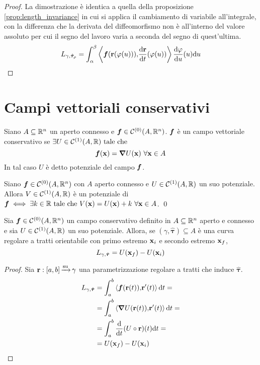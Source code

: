 \begin{proof}
	La dimostrazione è identica a quella della proposizione \ref{prop:length_invariance} in cui si applica il cambiamento di variabile all'integrale, con la differenza che la derivata del diffeomorfismo non è all'interno del valore assoluto per cui il segno del lavoro varia a seconda del segno di quest'ultima.
	$$
		L_{\gamma,\hat{\bm\tau}_\rho}=\int_{\alpha}^{\beta}\left\langle\bm f(\vb{r}(\varphi(u))){,}\frac{\dd \vb{r}}{\dd t}(\varphi(u))\right\rangle\frac{\dd \varphi}{\dd u}(u)\dd u
	$$
\end{proof}

\section{Campi vettoriali conservativi}

\begin{definition}
	Siano $A \subseteq \mathbb{R}^n$ un aperto connesso e $\bm f \in \mathcal{C}^{(0)}(A,\mathbb{R}^n)$. $\bm f$ è un campo vettoriale conservativo se $\exists U \in \mathcal{C}^{(1)}(A,\mathbb{R}) \text{ tale che }$
	$$
		\vecf(\vb{x})=\grad U(\vb{x}) \ \forall \vb{x} \in A
	$$
	In tal caso $U$ è detto potenziale del campo $\bm f$.
\end{definition}

\begin{prop}
	Siano $\bm f \in \mathcal{C}^{(0)}(A,\mathbb{R}^n)$ con $A$ aperto connesso e $U \in \mathcal{C}^{(1)}(A,\mathbb{R})$ un suo potenziale. Allora $V\in \mathcal{C}^{(1)}(A,\mathbb{R})$ è un potenziale di $\bm f \iff \exists k \in \mathbb{R} \text{ tale che } V(\vb{x})=U(\vb{x}) + k \ \forall \vb{x} \in A$.
	\qed
\end{prop}

\begin{theorem}
	\label{thm:cvc_work}
	Sia $\bm f \in \mathcal{C}^{(0)}(A,\mathbb{R}^n)$ un campo conservativo definito in $A\subseteq\mathbb{R}^n$ aperto e connesso e sia $U \in \mathcal{C}^{(1)}(A,\mathbb{R})$ un suo potenziale. Allora, se $(\gamma,\hat{\bm\tau}) \subseteq A$ è una curva regolare a tratti orientabile con primo estremo $\vb{x}_i$ e secondo estremo $\vb{x}_f$,
	$$
		L_{\gamma, \hat{\bm\tau}}=U(\vb{x}_f)-U(\vb{x}_i)
	$$
\end{theorem}

\begin{proof}
	Sia $\vb{r}:[a,b]\operatorname{\xrightarrow{\operatorname{su}}}\gamma$ una parametrizzazione regolare a tratti che induce $\hat{\bm\tau}$.
	\begin{align*}
		L_{\gamma,\hat{\bm\tau}}
		&=\int_{a}^{b}\left\langle\bm f (\vb{r}(t)){,}\vb{r}'(t)\right\rangle\dd t=\\
		&=\int_{a}^{b}\left\langle\grad U (\vb{r}(t)){,}\vb{r}'(t)\right\rangle\dd t=\\
		&=\int_{a}^{b}\frac{\dd}{\dd t}(U\circ \vb{r})(t)\dd t=\\
		&=U(\vb{x}_f)-U(\vb{x}_i)
	\end{align*}
\end{proof}

